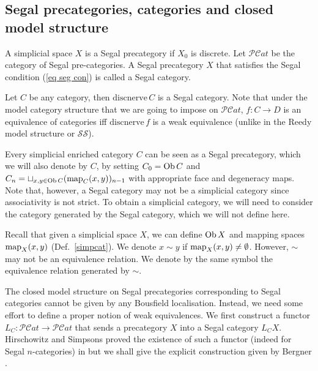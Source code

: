 \begin{refsection}
\subsection{Segal precategories, categories and closed model structure}
\begin{defin}
A simplicial space $X$ is a Segal precategory if $X_0$ is discrete. Let $\mathcal{PC}at$ be the category of Segal pre-categories. A Segal precategory $X$ that satisfies the Segal condition (\ref{eq seg con}) is called a Segal category.
\end{defin}

\begin{eg}
Let $C$ be any category, then $\mathrm{discnerve}\,C$ is a Segal category. Note that under the model category structure that we are going to impose on $\mathcal{PC}at$, $f:C\to D$ is an equivalence of categories iff $\mathrm{discnerve}\,f$ is a weak equivalence (unlike in the Reedy model structure or $\mathcal{SS}$).
\end{eg}

Every simplicial enriched category $C$ can be seen as a Segal precategory, which we will also denote by $C$, by setting $C_0=\operatorname{Ob} C$ and $C_n=\sqcup_{x,y\in\operatorname{Ob} C}(\operatorname{\mathrm{map}}_C(x,y))_{n-1}$ with appropriate face and degeneracy maps. Note that, however, a Segal category may not be a simplicial category since associativity is not strict. To obtain a simplicial category, we will need to consider the category generated by the Segal category, which we will not define here.

Recall that given a simplicial space $X$, we can define $\operatorname{Ob} X$ and mapping spaces $\operatorname{\mathrm{map}}_X(x,y)$ (Def.~\ref{simpcat}). We denote $x\sim y$ if $\operatorname{\mathrm{map}}_X(x,y)\ne\emptyset$. However, $\sim$ may not be an equivalence relation. We denote by the same symbol the equivalence relation generated by $\sim$.

The closed model structure on Segal precategories corresponding to Segal categories cannot be given by any Bousfield localisation. Instead, we need some effort to define a proper notion of weak equivalences. We first construct a functor $L_C:\mathcal{PC}at\to\mathcal{PC}at$ that sends a precategory $X$ into a Segal category $L_CX$. Hirschowitz and Simpsons proved the existence of such a functor (indeed for Segal $n$-categories) in \cite{hs} but we shall give the explicit construction given by Bergner \cite{bergner2}.


\end{refsection}
